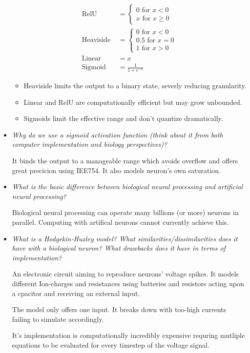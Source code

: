 \documentclass[
    fontsize      = 11pt,
    paper         = a4,
    twoside       = false,
    parskip       = half,
    pagesize      = false,
]{scrartcl}
\providecommand{\tightlist}{%
  \setlength{\itemsep}{0pt}\setlength{\parskip}{0pt}}
\begin{document}
\begin{itemize}
  \begin{align*}
    \text{RelU } &= \begin{cases} 0 \text{ for } x < 0\\ x \text{ for } x \geq 0\end{cases}\\[2ex]
    \text{Heaviside } &= \begin{cases} 0 \text{ for } x < 0\\ 0.5 \text{ for } x = 0\\ 1 \text{ for } x > 0\end{cases}\\[2ex]
    \text{Linear } &= x\\
    \text{Sigmoid} &= \frac{1}{1+e^{-x}}
    \end{align*}

  \begin{itemize}
  \tightlist
  \item
    Heaviside limits the output to a binary state, severly reducing
    granularity.
  \item
    Linear and RelU are computationally efficient but may grow
    unbounded.
  \item
    Sigmoids limit the effective range and don't quantize dramatically.
  \end{itemize}
\item
  \emph{Why do we use a sigmoid activation function (think about it from
  both computer implementation and biology perspectives)?}

  It binds the output to a manageable range which avoids overflow and
  offers great precicion using IEE754. It also models neuron's own
  saturation.
\item
  \emph{What is the basic difference between biological neural
  processing and artificial neural processing?}

  Biological neural processing can operate many billions (or more)
  neurons in parallel. Computing with artifical neurons cannot currently
  achieve this.
\item
  \emph{What is a Hodgekin-Huxley model? What
  similarities/dissimilarities does it have with a biological neuron?
  What drawbacks does it have in terms of implementation?}

  An electronic circuit aiming to reproduce neurons' voltage spikes. It
  models different Ion-charges and resistances using batteries and
  resistors acting upon a cpacitor and receiving an external input.

  The model only offers one input. It breaks down with too-high currents
  failing to simulate accordingly.

  It's implementation is computationally incredibly expensive requring
  mutliple equations to be evaluated for every timestep of the voltage
  signal.
\end{itemize}
\end{document}
